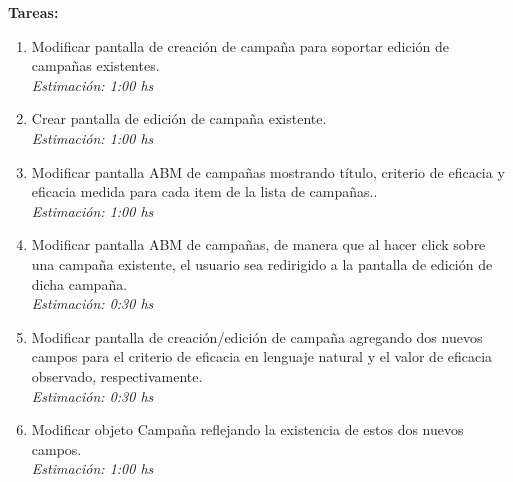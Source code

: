 \documentclass[a4paper, 10pt, twoside]{article}
\newenvironment{tasks}{
  \textbf{Tareas:}
  \begin{enumerate}
}{
  \end{enumerate}
}
\newcommand{\task}[2] {
  \item #1.\\
  \emph{Estimación: #2 hs}
}
\begin{document}
\begin{tasks}
  \task{Modificar pantalla de creación de campaña para soportar edición de campañas existentes}{1:00}
  \task{Crear pantalla de edición de campaña existente}{1:00}
  \task{Modificar pantalla ABM de campañas mostrando título, criterio de eficacia y eficacia medida para cada item de la lista de campañas.}{1:00}
  \task{Modificar pantalla ABM de campañas, de manera que al hacer click sobre una campaña existente, el usuario sea redirigido a la pantalla de edición de dicha campaña}{0:30}
  \task{Modificar pantalla de creación/edición de campaña agregando dos nuevos campos para el criterio de eficacia en lenguaje natural y el valor de eficacia observado, respectivamente}{0:30}
  \task{Modificar objeto Campaña reflejando la existencia de estos dos nuevos campos}{1:00}
\end{tasks}
\end{document}
